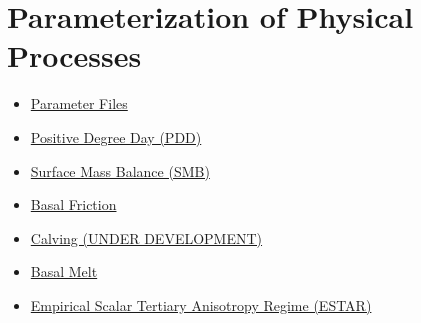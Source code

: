 
\section{Parameterization of Physical Processes} \label{sec:using-issm-parameterization}
\begin{itemize}
	\item \hyperref[sec:using-issm-parameterization-parameter-files]{Parameter Files}
	\item \hyperref[sec:using-issm-parameterization-pdd]{Positive Degree Day (PDD)}
	\item \hyperref[sec:using-issm-parameterization-surface-mass-balance]{Surface Mass Balance (SMB)}
	\item \hyperref[sec:using-issm-parameterization-friction]{Basal Friction}
	\item \hyperref[sec:using-issm-parameterization-calving]{Calving (UNDER DEVELOPMENT)}
	\item \hyperref[sec:using-issm-parameterization-basal-melt]{Basal Melt}
	\item \hyperref[sec:using-issm-parameterization-estar]{Empirical Scalar Tertiary Anisotropy Regime (ESTAR)}
\end{itemize}

\clearpage %

